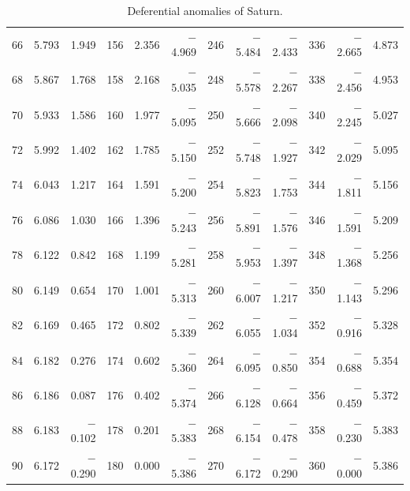 \begin{table}[!h]
{\begin{tabular}{rrr|rrr|rrr|rrr}
 66 &   5.793 &  1.949 & 156 &   2.356 & $-$4.969 & 246 &  $-$5.484 & $-$2.433 & 336 &  $-$2.665 &  4.873\\
 68 &   5.867 &  1.768 & 158 &   2.168 & $-$5.035 & 248 &  $-$5.578 & $-$2.267 & 338 &  $-$2.456 &  4.953\\
 70 &   5.933 &  1.586 & 160 &   1.977 & $-$5.095 & 250 &  $-$5.666 & $-$2.098 & 340 &  $-$2.245 &  5.027\\
 72 &   5.992 &  1.402 & 162 &   1.785 & $-$5.150 & 252 &  $-$5.748 & $-$1.927 & 342 &  $-$2.029 &  5.095\\
 74 &   6.043 &  1.217 & 164 &   1.591 & $-$5.200 & 254 &  $-$5.823 & $-$1.753 & 344 &  $-$1.811 &  5.156\\
 76 &   6.086 &  1.030 & 166 &   1.396 & $-$5.243 & 256 &  $-$5.891 & $-$1.576 & 346 &  $-$1.591 &  5.209\\
 78 &   6.122 &  0.842 & 168 &   1.199 & $-$5.281 & 258 &  $-$5.953 & $-$1.397 & 348 &  $-$1.368 &  5.256\\
 80 &   6.149 &  0.654 & 170 &   1.001 & $-$5.313 & 260 &  $-$6.007 & $-$1.217 & 350 &  $-$1.143 &  5.296\\
 82 &   6.169 &  0.465 & 172 &   0.802 & $-$5.339 & 262 &  $-$6.055 & $-$1.034 & 352 &  $-$0.916 &  5.328\\
 84 &   6.182 &  0.276 & 174 &   0.602 & $-$5.360 & 264 &  $-$6.095 & $-$0.850 & 354 &  $-$0.688 &  5.354\\
 86 &   6.186 &  0.087 & 176 &   0.402 & $-$5.374 & 266 &  $-$6.128 & $-$0.664 & 356 &  $-$0.459 &  5.372\\
 88 &   6.183 & $-$0.102 & 178 &   0.201 & $-$5.383 & 268 &  $-$6.154 & $-$0.478 & 358 &  $-$0.230 &  5.383\\
 90 &   6.172 & $-$0.290 & 180 &   0.000 & $-$5.386 & 270 &  $-$6.172 & $-$0.290 & 360 &  $-$0.000 &  5.386\\
\end{tabular}}
\caption{Deferential anomalies of Saturn.}\label{vt15}
\end{table}

